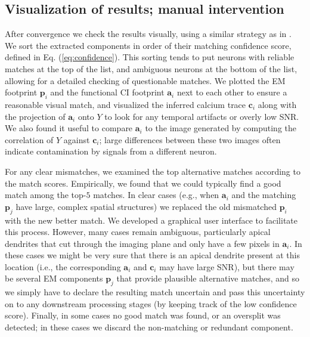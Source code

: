 \documentclass[10pt,letterpaper]{article}
\begin{document}
{\subsection{Visualization of results; manual intervention}

After convergence we check the results visually, using a similar strategy as in \citep{Pnevmatikakis2016, Zhou2018}. %
We sort the extracted components in order of their matching confidence score, defined in Eq. (\ref{eq:confidence}). This sorting tends to put neurons with reliable matches at the top of the list, and ambiguous neurons at the bottom of the list, allowing for a detailed checking of questionable matches. 
We plotted the EM footprint $\bm{p}_i$ and the functional CI footprint $\bm{a}_i$ next to each other to ensure a reasonable visual match, and visualized the inferred calcium trace $\bm{c}_i$ along with the projection of $\bm{a}_i$ onto $Y$ to look for any temporal artifacts or overly low SNR.  We also found it useful to compare $\bm{a}_i$ to the image generated by computing the correlation of $Y$ against $\bm{c}_i$; large differences between these two images often indicate contamination by signals from a different neuron. 



For any clear mismatches, we examined the top alternative matches according to the match scores. Empirically, we found that we could typically find a good match among the top-$5$ matches.  In clear cases (e.g., when $\bm{a}_i$ and the matching $\bm{p}_j$ have large, complex spatial structures) we replaced the old mismatched $\bm{p}_i$ with the new better match.  We developed a graphical user interface to facilitate this process. However, many cases remain ambiguous, particularly apical dendrites that cut through the imaging plane and only have a few pixels in $\bm{a}_i$.  In these cases we might be very sure that there is an apical dendrite present at this location (i.e., the corresponding $\bm{a}_i$ and $\bm{c}_i$ may have large SNR), but there may be several EM components $\bm{p}_j$ that provide plausible alternative matches, and so we simply have to declare the resulting match uncertain and pass this uncertainty on to any downstream processing stages (by keeping track of the low confidence score).
Finally, in some cases no good match was found, or an oversplit was detected; in these cases we discard the non-matching or redundant component.


}
\end{document}
